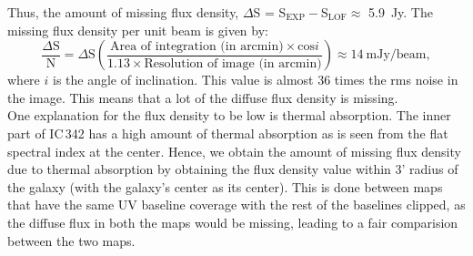 \documentclass[../main/thesis_msc.tex]{subfiles}
\begin{document}
Thus, the amount of missing flux density, $\Delta$S = S$_{\textrm{EXP}} -$S$_{\textrm{LOF}} \approx$ 5.9~Jy. The missing flux density per unit beam is given by:
\begin{equation}
\frac{\Delta\textrm{S}}{\textrm{N}} = \Delta\textrm{S} \left(\frac{\textrm{Area of integration (in arcmin)} \times \textrm{cos}i}{1.13 \times \textrm{Resolution of image (in arcmin)}}\right) \approx 14~\textrm{mJy/beam},
\end{equation}
where $i$ is the angle of inclination. This value is almost 36 times the rms noise in the image. This means that a lot of the diffuse flux density is missing.\\

One explanation for the flux density to be low is thermal absorption. The inner part of IC\,342 has a high amount of thermal absorption as is seen from the flat spectral index at the center. Hence, we obtain the amount of missing flux density due to thermal absorption by obtaining the flux density value within 3' radius of the galaxy (with the galaxy's center as its center). This is done between maps that have the same UV baseline coverage with the rest of the baselines clipped, as the diffuse flux in both the maps would be missing, leading to a fair comparision between the two maps. \\
\end{document}

